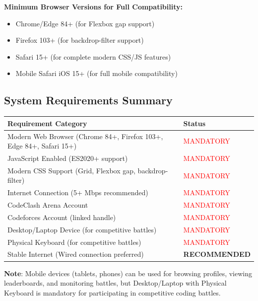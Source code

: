 \documentclass[12pt,a4paper]{article}
\begin{document}
\textbf{Minimum Browser Versions for Full Compatibility:}
\begin{itemize}[leftmargin=*]
\item Chrome/Edge 84+ (for Flexbox gap support)
\item Firefox 103+ (for backdrop-filter support)
\item Safari 15+ (for complete modern CSS/JS features)
\item Mobile Safari iOS 15+ (for full mobile compatibility)
\end{itemize}

\subsection{System Requirements Summary}

\begin{center}
\begin{tabular}{|p{7cm}|p{7cm}|}
\hline
\textbf{Requirement Category} & \textbf{Status} \\
\hline
Modern Web Browser (Chrome 84+, Firefox 103+, Edge 84+, Safari 15+) & \textcolor{red}{MANDATORY} \\
\hline
JavaScript Enabled (ES2020+ support) & \textcolor{red}{MANDATORY} \\
\hline
Modern CSS Support (Grid, Flexbox gap, backdrop-filter) & \textcolor{red}{MANDATORY} \\
\hline
Internet Connection (5+ Mbps recommended) & \textcolor{red}{MANDATORY} \\
\hline
CodeClash Arena Account & \textcolor{red}{MANDATORY} \\
\hline
Codeforces Account (linked handle) & \textcolor{red}{MANDATORY} \\
\hline
Desktop/Laptop Device (for competitive battles) & \textcolor{red}{MANDATORY} \\
\hline
Physical Keyboard (for competitive battles) & \textcolor{red}{MANDATORY} \\
\hline
Stable Internet (Wired connection preferred) & \textbf{RECOMMENDED} \\
\hline
\end{tabular}
\end{center}

\textbf{Note}: Mobile devices (tablets, phones) can be used for browsing profiles, viewing leaderboards, and monitoring battles, but Desktop/Laptop with Physical Keyboard is mandatory for participating in competitive coding battles.

\FloatBarrier
\end{document}
